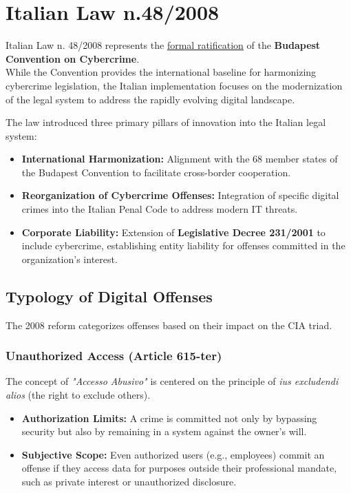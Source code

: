 \section{Italian Law n.48/2008}

Italian Law n. 48/2008 represents the \underline{formal ratification} of the \textbf{Budapest Convention on Cybercrime}.\\
While the Convention provides the international baseline for harmonizing cybercrime legislation, the Italian implementation focuses on the modernization of the legal system to address the rapidly evolving digital landscape.
\bigskip

\noindent
The law introduced three primary pillars of innovation into the Italian legal system:
\begin{itemize}
    \item \textbf{International Harmonization:} Alignment with the 68 member states of the Budapest Convention to facilitate cross-border cooperation.
    \item \textbf{Reorganization of Cybercrime Offenses:} Integration of specific digital crimes into the Italian Penal Code to address modern IT threats.
    \item \textbf{Corporate Liability:} Extension of \textbf{Legislative Decree 231/2001} to include cybercrime, establishing entity liability for offenses committed in the organization's interest.
\end{itemize}

\subsection{Typology of Digital Offenses}
The 2008 reform categorizes offenses based on their impact on the CIA triad.

\subsubsection*{Unauthorized Access (Article 615-ter)}
The concept of \textit{"Accesso Abusivo"} is centered on the principle of \textit{ius excludendi alios} (the right to exclude others). 
\begin{itemize}
    \item \textbf{Authorization Limits:} A crime is committed not only by bypassing security but also by remaining in a system against the owner's will.
    \item \textbf{Subjective Scope:} Even authorized users (e.g., employees) commit an offense if they access data for purposes outside their professional mandate, such as private interest or unauthorized disclosure.
\end{itemize}

